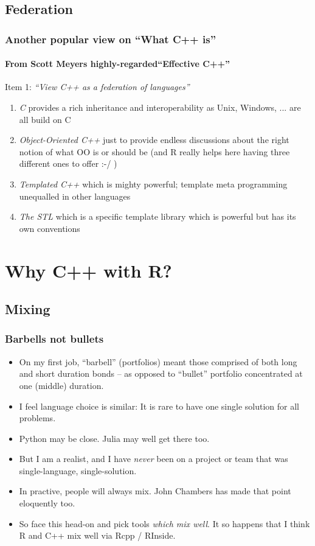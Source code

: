 \documentclass[handout,compress,dvipsnames,pdflatex,beamer]{beamer}
\begin{document}
\subsection{Federation}
\begin{frame}
  \frametitle{Another popular view on ``What C++ is''}
  \framesubtitle{From Scott Meyers highly-regarded``Effective C++''}

  Item 1:   \emph{``View C++ as a federation of languages''}

  \begin{enumerate}
  \item \emph{C} provides a rich inheritance and interoperability as Unix, Windows,
    ... are all build on C
  \item \emph{Object-Oriented C++} just to provide endless discussions about the
    right notion of what OO is or should be (and R really helps here having
    three different ones to offer :-/ )
  \item \emph{Templated C++} which is mighty powerful; template meta
    programming unequalled in other languages
  \item \emph{The STL} which is a specific template library which is powerful but
    has its own conventions
  \end{enumerate}
  
\end{frame}

\section[With R]{Why C++ with R?}
\subsection{Mixing}
\begin{frame}
  \frametitle{Barbells not bullets}
  \begin{itemize}
  \item On my first job, ``barbell'' (portfolios) meant those comprised of
    both long and short duration bonds -- as opposed to ``bullet'' portfolio concentrated at one (middle) duration.
  \item I feel language choice is similar:  It is rare to have one single
    solution for all problems.
  \item Python may be close.  Julia may well get there too.
  \item But I am a realist, and I have \emph{never} been on a project or
    team that was single-language, single-solution.
  \item In practive, people will always mix.  John Chambers has made that
    point eloquently too.
  \item So face this head-on and pick tools \emph{which mix well}.  It so
    happens that I think R and C++ mix well via Rcpp / RInside.
  \end{itemize}
\end{frame}
\end{document}
